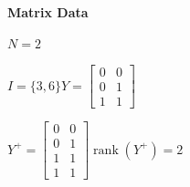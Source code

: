 \documentclass[11pt]{article}
\begin{document}
\par\medskip

\noindent\textbf{Matrix Data}
\par $N=2$
\par $I=\{3,6\}$\quad$Y=\begin{bmatrix}0 & 0 \\ 0 & 1 \\ 1 & 1\end{bmatrix}$
\par $Y^{+}=\begin{bmatrix}0 & 0 \\ 0 & 1 \\ 1 & 1 \\ 1 & 1\end{bmatrix}$\quad$\operatorname{rank}(Y^{+})=2$
\end{document}
